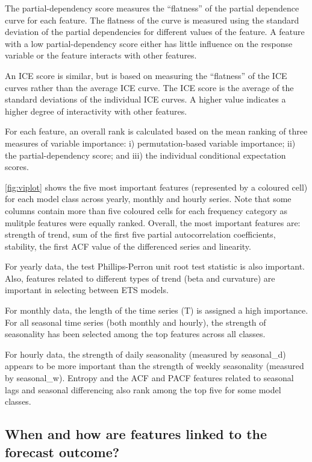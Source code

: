 \documentclass[11pt,a4paper,]{article}
\begin{document}
The partial-dependency score measures the ``flatness'' of the partial dependence curve for each feature. The flatness of the curve is measured using the standard deviation of the partial dependencies for different values of the feature. A feature with a low partial-dependency score either has little influence on the response variable or the feature interacts with other features.

An ICE score is similar, but is based on measuring the ``flatness'' of the ICE curves rather than the average ICE curve. The ICE score is the average of the standard deviations of the individual ICE curves. A higher value indicates a higher degree of interactivity with other features.

For each feature, an overall rank is calculated based on the mean ranking of three measures of variable importance: i) permutation-based variable importance; ii) the partial-dependency score; and iii) the individual conditional expectation scores.

\autoref{fig:viplot} shows the five most important features (represented by a coloured cell) for each model class across yearly, monthly and hourly series. Note that some columns contain more than five coloured cells for each frequency category as mulitple features were equally ranked. Overall, the most important features are: strength of trend, sum of the first five partial autocorrelation coefficients, stability, the first ACF value of the differenced series and linearity.

For yearly data, the test Phillips-Perron unit root test statistic is also important. Also, features related to different types of trend (beta and curvature) are important in selecting between ETS models.

For monthly data, the length of the time series (T) is assigned a high importance. For all seasonal time series (both monthly and hourly), the strength of seasonality has been selected among the top features across all classes.

For hourly data, the strength of daily seasonality (measured by seasonal\_d) appears to be more important than the strength of weekly seasonality (measured by seasonal\_w). Entropy and the ACF and PACF features related to seasonal lags and seasonal differencing also rank among the top five for some model classes.

\hypertarget{when-and-how-are-features-linked-to-the-forecast-outcome}{%
\subsection{When and how are features linked to the forecast outcome?}\label{when-and-how-are-features-linked-to-the-forecast-outcome}}
\end{document}
